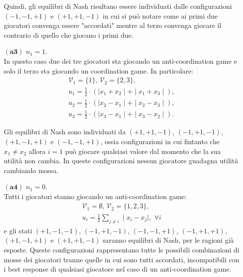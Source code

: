 \documentclass[11pt,largemargins]{homework}
\begin{document}
\begin{alphaparts}
\begin{itemize}
  Quindi, gli equilibri di Nash risultano essere individuati dalle configurazioni $\left(-1,-1,+1\right)$ e $\left(+1,+1,-1\right)$ in cui si può notare come ai primi due giocatori convenga essere "accordati" mentre al terzo convenga giocare il contrario di quello che giocano i primi due.
  
  
  \item[$\left(\textbf{a3}\right)$]  $n_{1}=1$.\\ %
  In questo caso due dei tre giocatori sta giocando un anti-coordination game e solo il terzo sta giocando un coordination game. In particolare:
  \begin{gather*}
  \mathcal{V}_{1}=\{1\},\, \mathcal{V}_{2}=\{2,3\},\\
  u_{1}=\frac{1}{2}\cdot \left(\mid x_{1}+x_{2}\mid + \mid x_{1}+x_{3}\mid\right), \\
  u_{2}=\frac{1}{2}\cdot \left(\mid x_{2}-x_{1}\mid + \mid x_{2}-x_{3}\mid\right), \\
  u_{3}=\frac{1}{2}\cdot \left(\mid x_{3}-x_{1}\mid + \mid x_{3}-x_{2}\mid\right).
  \end{gather*}
  
  Gli equilibri di Nash sono individuati da $\left(+1,+1,-1\right)$, $\left(-1,+1,-1\right)$, $\left(+1,-1,+1\right)$ e $\left(-1,-1,+1\right)$, ossia configurazioni in cui fintanto che \(x_1 \neq x_2\) allora \(i=1\) può giocare qualsiasi valore dal momento che la sua utilità non cambia. In queste configurazioni nessun giocatore guadagna utilità cambiando mossa.
  
  
  
  \item[$\left(\textbf{a4}\right)$] $n_{1}=0$.\\%
  Tutti i giocatori stanno giocando un anti-coordination game:
  \begin{align*}
  \mathcal{V}_{1}=\emptyset, \, \mathcal{V}_{2}=\{1,2,3\},\\
  u_{i}=\frac{1}{2}\sum_{j\neq i}\mid x_{i}-x_{j}\mid, \,\, \forall i
  \end{align*}
  e gli stati $\left(+1,-1,-1\right)$, $\left(-1,+1,-1\right)$, $\left(-1,-1,+1\right)$, $\left(-1,+1,+1\right)$, $\left(+1,-1,+1\right)$ e $\left(+1,+1,-1\right)$ saranno equilibri di Nash, per le ragioni già esposte. Queste configurazioni rappresentano tutte le possibili combinazioni di mosse dei giocatori tranne quelle in cui sono tutti accordati, incompatibili con i best response di qualsiasi giocatore nel caso di un anti-coordination game.
  \end{itemize}
  

\end{alphaparts}
\end{document}
